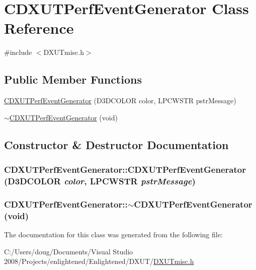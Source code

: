 \hypertarget{class_c_d_x_u_t_perf_event_generator}{
\section{CDXUTPerfEventGenerator Class Reference}
\label{class_c_d_x_u_t_perf_event_generator}
}


{\ttfamily \#include $<$DXUTmisc.h$>$}\subsection*{Public Member Functions}
\begin{DoxyCompactItemize}
\item 
\hyperlink{class_c_d_x_u_t_perf_event_generator_a4fb7131bffda9ab671635c039bf90d31}{CDXUTPerfEventGenerator} (D3DCOLOR color, LPCWSTR pstrMessage)
\item 
\hyperlink{class_c_d_x_u_t_perf_event_generator_aa4fef9e23ab4704417857f8d49a75ef0}{$\sim$CDXUTPerfEventGenerator} (void)
\end{DoxyCompactItemize}


\subsection{Constructor \& Destructor Documentation}
\hypertarget{class_c_d_x_u_t_perf_event_generator_a4fb7131bffda9ab671635c039bf90d31}{
\subsubsection[{CDXUTPerfEventGenerator}]{\setlength{\rightskip}{0pt plus 5cm}CDXUTPerfEventGenerator::CDXUTPerfEventGenerator (D3DCOLOR {\em color}, \/  LPCWSTR {\em pstrMessage})}}
\label{class_c_d_x_u_t_perf_event_generator_a4fb7131bffda9ab671635c039bf90d31}
\hypertarget{class_c_d_x_u_t_perf_event_generator_aa4fef9e23ab4704417857f8d49a75ef0}{
\subsubsection[{$\sim$CDXUTPerfEventGenerator}]{\setlength{\rightskip}{0pt plus 5cm}CDXUTPerfEventGenerator::$\sim$CDXUTPerfEventGenerator (void)}}
\label{class_c_d_x_u_t_perf_event_generator_aa4fef9e23ab4704417857f8d49a75ef0}


The documentation for this class was generated from the following file:\begin{DoxyCompactItemize}
\item 
C:/Users/doug/Documents/Visual Studio 2008/Projects/enlightened/Enlightened/DXUT/\hyperlink{_d_x_u_tmisc_8h}{DXUTmisc.h}\end{DoxyCompactItemize}
